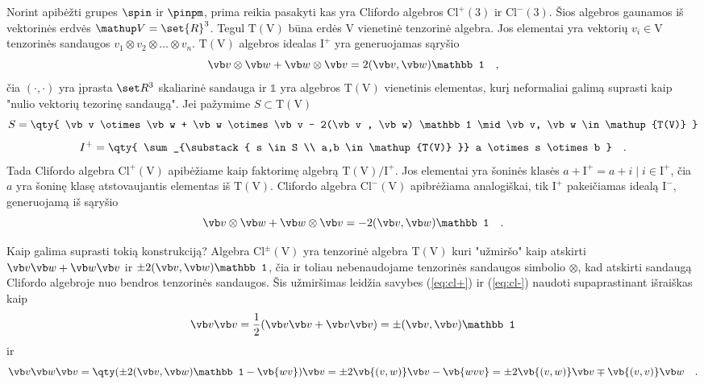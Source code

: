 
Norint apibėžti grupes $\spin$ ir $\pinpm$, prima reikia pasakyti kas yra Clifordo algebros
$\mathup{Cl}^+(3)$ ir $\mathup{Cl}^-(3)$. Šios algebros gaunamos iš vektorinės erdvės $\mathup V = \set{R}^3$.
Tegul $\mathup{T(V)}$ būna erdės $\mathup V$ vienetinė tenzorinė algebra. Jos elementai yra vektorių $v_i \in \mathup V$ tenzorinės
sandaugos $v_1 \otimes v_2 \otimes \dots \otimes v_n$. $\mathup{T(V)}$ algebros idealas $\mathup I^+$ yra generuojamas
sąryšio
\begin{equation}
	\vb v \otimes \vb w
	+
	\vb w \otimes \vb v
	=
	2(\vb v , \vb w) \mathbb 1
	\quad ,
	\label{eq:cl+}
\end{equation}
čia $(\cdot,\cdot)$ yra įprasta $\set R ^3$ skaliarinė sandauga ir $\mathbb 1$ yra algebros $\mathup{T(V)}$
vienetinis elementas, kurį neformaliai galimą suprasti kaip "nulio vektorių tezorinę sandaugą".
Jei pažymime $S \subset \mathup{T(V)}$
\begin{equation}
	S = \qty{
		\vb v \otimes \vb w
		+
		\vb w \otimes \vb v
		-
		2(\vb v , \vb w) \mathbb 1
		\mid
		\vb v, \vb w \in \mathup{T(V)}
	}
\end{equation}
\begin{equation}
	I^+ = \qty{
		\sum_{\substack{
			s \in S \\ 
			a,b \in \mathup{T(V)} 
		}}
		a \otimes s \otimes b
	}
	\quad .
\end{equation}
Tada Clifordo algebra $\mathup{Cl^+(V)}$ apibėžiame kaip faktorimę algebrą $\mathup{T(V)/I^+}$.
Jos elementai yra šoninės klasės $a + \mathup I^+ = {a + i \mid i \in \mathup I^+}$, čia $a$
yra šoninę klasę atstovaujantis elementas iš $\mathup{T(V)}$. Clifordo algebra $\mathup{Cl^-(V)}$
apibrėžiama analogiškai, tik $\mathup I^+$ pakeičiamas idealą $\mathup I^-$, generuojamą iš sąryšio
\begin{equation}
	\vb v \otimes \vb w
	+
	\vb w \otimes \vb v
	=
	- 2(\vb v , \vb w) \mathbb 1
	\quad .
	\label{eq:cl-}
\end{equation}


Kaip galima suprasti tokią konstrukciją? Algebra $\mathup{Cl^\pm(V)}$ yra tenzorinė algebra $\mathup{T(V)}$
kuri "užmiršo" kaip atskirti $\vb v \vb w + \vb w \vb v$ ir $\pm2(\vb v, \vb w) \mathbb 1$,
čia ir toliau nebenaudojame tenzorinės sandaugos simbolio $\otimes$, kad atskirti sandaugą Clifordo algebroje
nuo bendros tenzorinės sandaugos.
Šis užmiršimas leidžia savybes (\ref{eq:cl+}) ir (\ref{eq:cl-}) naudoti supaprastinant išraiškas kaip
\begin{equation}
\vb v \vb v 
= \frac{1}{2}(\vb v \vb v + \vb v \vb v) 
= \pm(\vb v,\vb v) \mathbb 1
\end{equation}
ir
\begin{equation}
\vb v \vb w \vb v 
= \qty( \pm2(\vb v,\vb w)\mathbb 1 - \vb{wv} )\vb v 
= \pm2\vb{(v,w)} \vb v - \vb{wvv} 
=  \pm2\vb{(v,w)} \vb v \mp \vb{(v,v)}\vb w 
\quad .
\end{equation}

